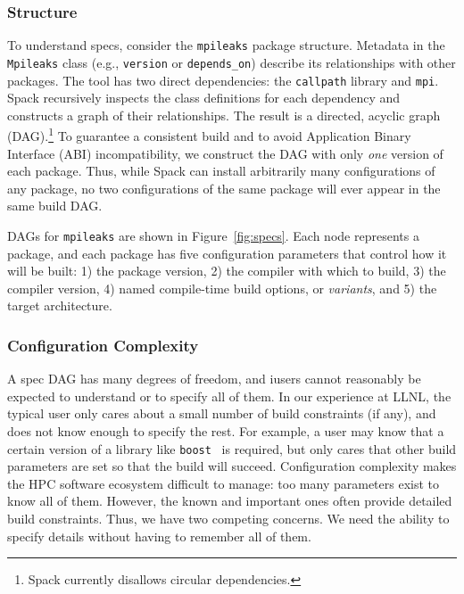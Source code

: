 \subsubsection{Structure}
To understand specs, consider the {\tt mpileaks} package structure.
Metadata in the {\tt Mpileaks} class (e.g., {\tt version} or 
{\tt depends\_on}) describe its relationships with other packages.  
The tool has two direct dependencies:
the {\tt callpath} library and {\tt mpi}.  Spack recursively inspects the class definitions
for each dependency and constructs a graph of their relationships.  The result
is a directed, acyclic graph (DAG).\footnote{Spack currently disallows
circular dependencies.}
%
To guarantee a consistent build and to avoid
Application Binary Interface (ABI) incompatibility, we construct
the DAG with only {\it one} version of each package.  Thus, while
Spack can install arbitrarily many configurations of any package,
no two configurations of the same package will ever appear in the same build DAG.

DAGs for {\tt mpileaks} are shown in Figure~\ref{fig:specs}.
Each node represents a package, and each package has five configuration parameters that control
how it will be built: 1) the package version, 2) the compiler with which to
build, 3) the compiler version, 4) named compile-time build options, or 
{\it variants}, and 5) the target architecture.


\subsubsection{Configuration Complexity}
A spec DAG has many degrees of freedom, and iusers cannot reasonably be 
expected to understand or to specify all of them.  In our experience at LLNL, 
the typical user only cares about a small number of build constraints (if any),
and does not know enough to
specify the rest. For example, a user may know that a certain version of a library like
{\tt boost}~\cite{boost} is required, but only cares that other build parameters are set so that
the build will succeed.
%
Configuration complexity makes the HPC software ecosystem difficult to manage: 
too many parameters exist to know all of them. However, the known and 
important ones often provide detailed build constraints. Thus, we have two 
competing concerns.  We need the ability to specify details
without having to remember all of them.

